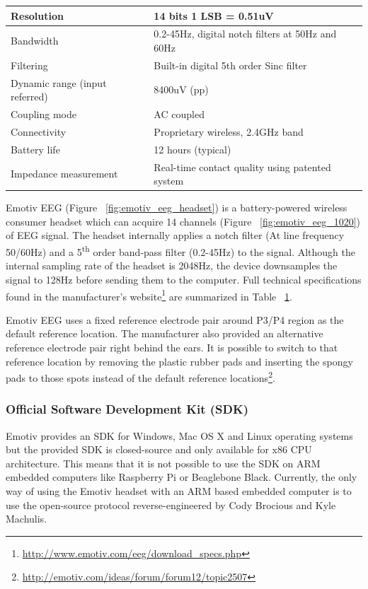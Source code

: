 \documentclass[12pt]{article}
\newcommand\mysubsubsection[1]{\subsubsection{#1}}
\numberwithin{equation}{section}
\numberwithin{figure}{section}
\numberwithin{table}{section}
\begin{document}
{\begin{table}
\begin{tabular}{ll}
            Resolution & 14 bits 1 LSB = 0.51uV \\ \hline
            Bandwidth & 0.2-45Hz, digital notch filters at 50Hz and 60Hz \\ \hline
            Filtering & Built-in digital 5th order Sinc filter \\ \hline
            Dynamic range (input referred) & 8400uV (pp) \\ \hline
            Coupling mode & AC coupled \\ \hline
            Connectivity & Proprietary wireless, 2.4GHz band \\ \hline
            Battery life & 12 hours (typical) \\ \hline
            Impedance measurement & Real-time contact quality using patented system \\ \hline
        \end{tabular}
        \label{table:emotiv_eeg_specs}
    \end{table}
    Emotiv EEG (Figure ~\ref{fig:emotiv_eeg_headset}) is a battery-powered wireless consumer headset which can
    acquire 14 channels (Figure ~\ref{fig:emotiv_eeg_1020}) of EEG signal. The headset internally applies a
    notch filter (At line frequency 50/60Hz) and a 5\textsuperscript{th} order band-pass filter (0.2-45Hz)
    to the signal. Although the internal sampling rate of the headset is 2048Hz, the device
    downsamples the signal to 128Hz before sending them to the computer. Full technical specifications found in the
    manufacturer's website\footnote{\url{http://www.emotiv.com/eeg/download_specs.php}} are summarized in Table ~\ref{table:emotiv_eeg_specs}.
}
\par{
    Emotiv EEG uses a fixed reference electrode pair around P3/P4 region as the default
    reference location. The manufacturer also provided an alternative reference electrode
    pair right behind the ears. It is possible to switch to that reference location
    by removing the plastic rubber pads and inserting the spongy pads to those spots
    instead of the default reference locations\footnote{\url{http://emotiv.com/ideas/forum/forum12/topic2507}}.
}

\mysubsubsection{Official Software Development Kit (SDK)}\label{seq:emotiveeg_sdk}

\par{
Emotiv provides an SDK for Windows, Mac OS X and Linux operating systems but the provided SDK is
closed-source and only available for x86 CPU architecture. This means that it is not possible
to use the SDK on ARM embedded computers like Raspberry Pi or Beaglebone Black.
Currently, the only way of using the Emotiv headset with an ARM based embedded computer is to use the
open-source protocol reverse-engineered by Cody Brocious and Kyle Machulis.
}
\end{document}
